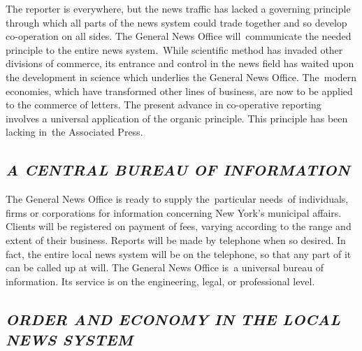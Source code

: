 \documentclass[twoside,symmetric,nobib,justified]{tufte-book}
\begin{document}
The reporter is everywhere, but the news traffic has lacked a governing
principle through which all parts of the news system could trade
together and so develop co-operation on all sides. The General News
Office will~communicate the needed principle to the entire news
system.~While scientific method has invaded other divisions of commerce,
its entrance and control in the news field has waited upon the
development in science which underlies the General News Office.
The~modern economies, which have transformed other lines of business,
are now to be applied to the commerce of letters. The present advance in
co-operative reporting involves a universal application of the organic
principle. This principle has been lacking in~the Associated Press.~

\hypertarget{a-central-bureau-of-information}{%
\subsection{\emph{A CENTRAL BUREAU OF
INFORMATION}}\label{a-central-bureau-of-information}}

The General News Office is ready to supply the~particular needs~of
individuals, firms or corporations for information concerning New York's
municipal affairs. Clients will be registered on payment of fees,
varying according to the range and extent of their business. Reports
will be made by telephone when so desired. In fact, the entire local
news system will be on the telephone, so that any part of it can be
called up at will. The General News Office is~a universal bureau of
information. Its service is on the engineering, legal, or professional
level.~

\hypertarget{order-and-economy-in-the-local-news-system}{%
\subsection{\emph{ORDER AND ECONOMY IN THE LOCAL NEWS
SYSTEM}}\label{order-and-economy-in-the-local-news-system}}
\end{document}
